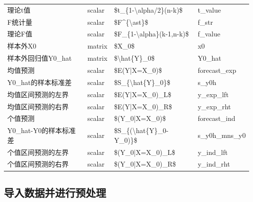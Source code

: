 \documentclass[12pt,(landscape,a4paper),(portrait,a4paper)]{article}
\begin{document}
\begin{table}
\begin{tabular}[t]{llll}
\addlinespace
理论t值 & scalar & \$t\_\{1-\textbackslash{}alpha/2\}(n-k)\$ & t\_value\\
F统计量 & scalar & \$F\textasciicircum{}\{\textbackslash{}ast\}\$ & f\_str\\
理论F值 & scalar & \$F\_\{1-\textbackslash{}alpha\}(k-1,n-k)\$ & f\_value\\
样本外X0 & matrix & \$X\_0\$ & x0\\
样本外回归值Y0\_hat & matrix & \$\textbackslash{}hat\{Y\}\_0\$ & Y0\_hat\\
\addlinespace
均值预测 & scalar & \$E(Y|X=X\_0)\$ & forecast\_exp\\
Y0\_hat的样本标准差 & scalar & \$S\_\{\textbackslash{}hat\{Y\}\_0\}\$ & s\_y0h\\
均值区间预测的左界 & scalar & \$E(Y|X=X\_0)\_L\$ & y\_exp\_lft\\
均值区间预测的右界 & scalar & \$E(Y|X=X\_0)\_R\$ & y\_exp\_rht\\
个值预测 & scalar & \$(Y\_0|X=X\_0)\$ & forecast\_ind\\
\addlinespace
Y0\_hat-Y0的样本标准差 & scalar & \$S\_\{(\textbackslash{}hat\{Y\}\_0-Y\_0)\}\$ & s\_y0h\_mns\_y0\\
个值区间预测的左界 & scalar & \$(Y\_0|X=X\_0)\_L\$ & y\_ind\_lft\\
个值区间预测的右界 & scalar & \$(Y\_0|X=X\_0)\_R\$ & y\_ind\_rht\\
\bottomrule
\end{tabular}
\end{table}

\subsection{导入数据并进行预处理}
\end{document}
